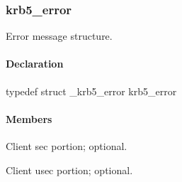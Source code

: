 \documentclass[letterpaper,10pt,english]{sphinxmanual}
\begin{document}
\subsubsection{krb5\_error}
\label{appdev/refs/types/krb5_error:krb5-error-struct}\label{appdev/refs/types/krb5_error:krb5-error}\label{appdev/refs/types/krb5_error::doc}

\begin{fulllineitems}
\label{appdev/refs/types/krb5_error:krb5_error}
\end{fulllineitems}


Error message structure.


\paragraph{Declaration}
\label{appdev/refs/types/krb5_error:declaration}
typedef struct \_krb5\_error  krb5\_error


\paragraph{Members}
\label{appdev/refs/types/krb5_error:members}

\begin{fulllineitems}
\label{appdev/refs/types/krb5_error:krb5_error.magic}
\end{fulllineitems}


\begin{fulllineitems}
\label{appdev/refs/types/krb5_error:krb5_error.ctime}
Client sec portion; optional.

\end{fulllineitems}


\begin{fulllineitems}
\label{appdev/refs/types/krb5_error:krb5_error.cusec}
Client usec portion; optional.

\end{fulllineitems}
\end{document}
